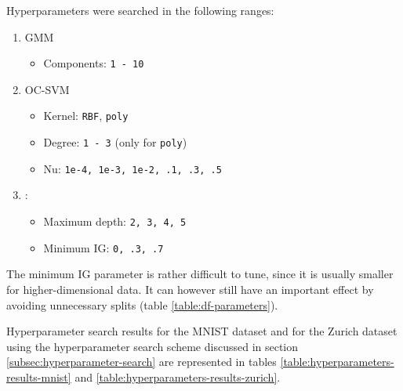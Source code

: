 \documentclass[10pt]{article}
\begin{document}
Hyperparameters were searched in the following ranges:
\begin{enumerate}
    \item \gls{GMM}
    \begin{itemize}
        \item Components: \texttt{1 - 10}
    \end{itemize}
    \item \gls{OC-SVM}
    \begin{itemize}
        \item Kernel: \texttt{\gls{RBF}}, \texttt{poly}
        \item Degree: \texttt{1 - 3} (only for \texttt{poly})
        \item Nu: \texttt{1e-4, 1e-3, 1e-2, .1, .3, .5}
    \end{itemize}
    \item {}:
    \begin{itemize}
        \item Maximum depth: \texttt{2, 3, 4, 5}
        \item Minimum \gls{IG}: \texttt{0, .3, .7}
    \end{itemize}
\end{enumerate}


The minimum \acrlong{IG} parameter is rather difficult to tune, since it is usually smaller for higher-dimensional data. It can however still have an important effect by avoiding unnecessary splits (table \ref{table:df-parameters}).

Hyperparameter search results for the \gls{MNIST} dataset and for the Zurich dataset using the hyperparameter search scheme discussed in section \ref{subsec:hyperparameter-search} are represented in tables \ref{table:hyperparameters-results-mnist} and \ref{table:hyperparameters-results-zurich}.
\end{document}
